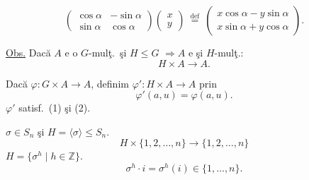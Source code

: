 \[
\begin{pmatrix}
\cos\alpha & -\sin\alpha\\
\sin\alpha & \cos\alpha
\end{pmatrix}
\begin{pmatrix}x\\y\end{pmatrix}
\ \overset{\mathrm{def}}{=}\
\begin{pmatrix}
x\cos\alpha-y\sin\alpha\\
x\sin\alpha+y\cos\alpha
\end{pmatrix}.
\]

\bigskip
\noindent\underline{Obs.} Dacă $A$ e o $G$-mulţ.\ şi $H\leq G$
$\Longrightarrow A$ e şi $H$-mulţ.:
\[
H\times A\longrightarrow A.
\]

\noindent Dacă $\varphi:G\times A\longrightarrow A$, definim
$\varphi':H\times A\longrightarrow A$ prin
\[
\varphi'(a,u)=\varphi(a,u).
\]
\noindent $\varphi'$ satisf.\ (1) şi (2).

\bigskip
\noindent $\sigma\in S_n$ şi $H=\langle\sigma\rangle\leq S_n$.
\[
H\times\{1,2,\ldots,n\}\longrightarrow\{1,2,\ldots,n\}
\]
\noindent $H=\{\sigma^h\mid h\in\mathbb{Z}\}$.
\[
\sigma^h\cdot i=\sigma^h(i)\in\{1,\ldots,n\}.
\]
